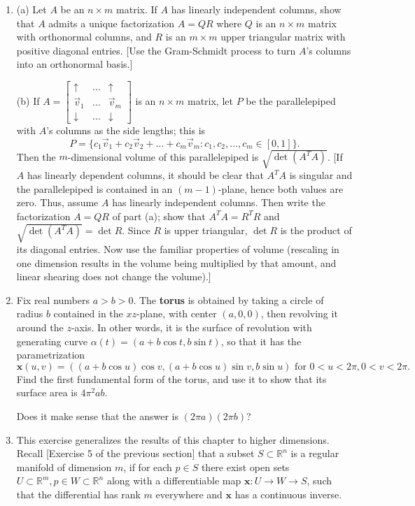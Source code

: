 \documentclass[leqno]{book}
\begin{document}
\begin{enumerate}
\item (a) Let $A$ be an $n\times m$ matrix.  If $A$ has linearly independent columns, show that $A$ admits a unique factorization $A=QR$ where $Q$ is an $n\times m$ matrix with orthonormal columns, and $R$ is an $m\times m$ upper triangular matrix with positive diagonal entries.  [Use the Gram-Schmidt process to turn $A$'s columns into an orthonormal basis.]

(b) If $A=\begin{bmatrix}\uparrow&\dots&\uparrow\\\vec v_1&\dots&\vec v_m\\\downarrow&\dots&\downarrow\end{bmatrix}$ is an $n\times m$ matrix, let $P$ be the parallelepiped with $A$'s columns as the side lengths; this is
$$P=\{c_1\vec v_1+c_2\vec v_2+\dots+c_m\vec v_m:c_1,c_2,\dots,c_m\in[0,1]\}.$$
Then the $m$-dimensional volume of this parallelepiped is $\sqrt{\det(A^TA)}$.  [If $A$ has linearly dependent columns, it should be clear that $A^TA$ is singular and the parallelepiped is contained in an $(m-1)$-plane, hence both values are zero.  Thus, assume $A$ has linearly independent columns.  Then write the factorization $A=QR$ of part (a); show that $A^TA=R^TR$ and $\sqrt{\det(A^TA)}=\det R$.  Since $R$ is upper triangular, $\det R$ is the product of its diagonal entries.  Now use the familiar properties of volume (rescaling in one dimension results in the volume being multiplied by that amount, and linear shearing does not change the volume).]

\item Fix real numbers $a>b>0$.  The \textbf{torus} is obtained by taking a circle of radius $b$ contained in the $xz$-plane, with center $(a,0,0)$, then revolving it around the $z$-axis.  In other words, it is the surface of revolution with generating curve $\alpha(t)=(a+b\cos t,b\sin t)$, so that it has the parametrization
$$\mathbf x(u,v)=((a+b\cos u)\cos v,(a+b\cos u)\sin v,b\sin u)\text{ for }0<u<2\pi,0<v<2\pi.$$
Find the first fundamental form of the torus, and use it to show that its surface area is $4\pi^2ab$.

Does it make sense that the answer is $(2\pi a)(2\pi b)$?

\item This exercise generalizes the results of this chapter to higher dimensions.  Recall [Exercise 5 of the previous section] that a subset $S\subset\mathbb R^n$ is a regular manifold of dimension $m$, if for each $p\in S$ there exist open sets $U\subset\mathbb R^m,p\in W\subset\mathbb R^n$ along with a differentiable map $\mathbf x:U\to W\to S$, such that the differential has rank $m$ everywhere and $\mathbf x$ has a continuous inverse.


\end{enumerate}
\end{document}

